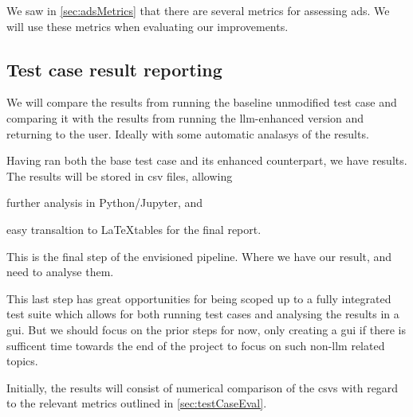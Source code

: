 We saw in \cref{sec:adsMetrics} that there are several metrics for assessing
\acrshort{ads}. We will use these metrics when evaluating our improvements.

\subsection{Test case result reporting}

We will compare the results from running
the baseline unmodified test case and comparing it with the results from
running the \acrshort{llm}-enhanced version and returning to the user. Ideally with
some automatic analasys of the results.

Having ran both the base test case and its enhanced counterpart, we have
results. The results will be stored in \acrfull{csv} files, allowing \begin{inparaenum}
    \item further analysis in Python/Jupyter,
    and
    \item easy transaltion to \LaTeX tables for the final report.
\end{inparaenum}

This is the final step of the envisioned pipeline. Where we have our result, and
need to analyse them.

This last step has great opportunities for being scoped up to a fully integrated
test suite which allows for both running test cases and analysing the results in
a \acrfull{gui}. But we should focus on the prior steps for now, only creating a
\acrshort{gui} if there is sufficent time towards the end of the project to
focus on such non-\acrshort{llm} related topics.

Initially, the results will consist of numerical comparison of the
\acrshort{csv}s with regard to the relevant metrics outlined in
\cref{sec:testCaseEval}.
